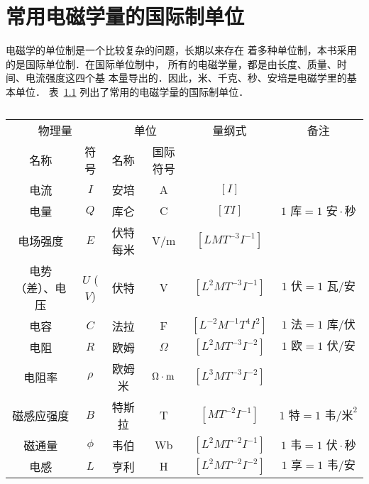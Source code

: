 \chapter{常用电磁学量的国际制单位}

电磁学的单位制是一个比较复杂的问题，长期以来存在
着多种单位制，本书采用的是国际单位制．在国际单位制中，
所有的电磁学量，都是由长度、质量、时间、电流强度这四个基
本量导出的．因此，米、千克、秒、安培是电磁学里的基本单位．
表~\ref{tab_C_10-1} 列出了常用的电磁学量的国际制单位．

\begin{table}[htbp]
	\centering
	\caption{}\label{tab_C_10-1}
    \begin{tabular}{cc|cc|c|c}
  		\toprule
		\multicolumn{2}{c|}{物理量} & \multicolumn{2}{c|}{单位} & 量纲式 & 备注\\
		名称 & 符号 & 名称 & 国际符号 & & \\
		  \midrule
		电流   &  $I$ & 安培 & A & $[I]$ & \\
		电量    &  $Q$  &  库仑  & C   & $[TI]$  &  $1 \text{ 库}=1\text{ 安}\cdot \text{秒}$\\
		电场强度    &$E$    &  伏特每米  & V/m   &  $[LMT^{-3}I^{-1}]$  & \\
		电势（差）、电压& $U$ ($V$)   &  伏特  &  V  &  $[L^2MT^{-3}I^{-1}]$ & $1 \text{ 伏} =1 \text{ 瓦}/\text{安}$ \\
		电容    &  $C$  &  法拉  & F   &  $[L^{-2}M^{-1}T^{4}I^{2}]$  & $1 \text{ 法}=1 \text{ 库}/\text{伏}$ \\
		电阻    & $R$  & 欧姆  &  $\Omega$ & $[L^2MT^{-3}I^{-2}]$  & $1 \text{ 欧}=1 \text{ 伏}/\text{安}$ \\
		电阻率    & $\rho$  & 欧姆米  &  $\Omega\cdot {\rm m}$ & $[L^3MT^{-3}I^{-2}]$  & \\
		磁感应强度    & $B$  & 特斯拉  & T  &  $[MT^{-2}I^{-1}]$ & $1 \text{ 特}=1 \text{ 韦}/\text{米}^2$ \\
		磁通量    & $\phi$  & 韦伯  & Wb  & $[L^2MT^{-2}I^{-1}]$ & $1 \text{ 韦}=1 \text{ 伏}\cdot\text{秒}$ \\
		电感    & $L$  & 亨利  & H  &  $[L^2MT^{-2}I^{-2}]$ & $1 \text{ 享}=1 \text{ 韦}/\text{安}$ \\
		  \bottomrule   
    \end{tabular}
\end{table}

